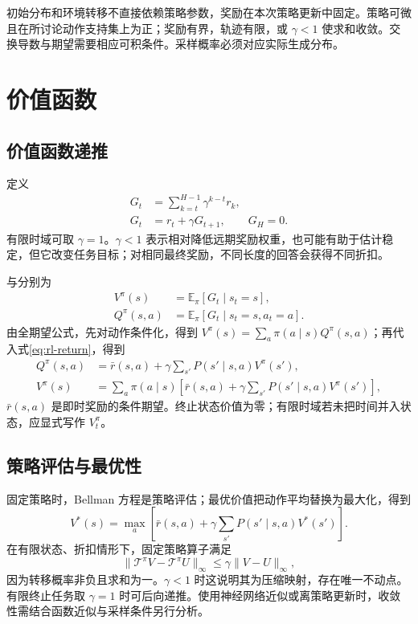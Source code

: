 \documentclass[../textbook.tex]{subfiles}
\begin{document}
\begin{assumption}[策略梯度的前提]
初始分布和环境转移不直接依赖策略参数，奖励在本次策略更新中固定。策略可微且在所讨论动作支持集上为正；奖励有界，轨迹有限，或 $\gamma<1$ 使求和收敛。交换导数与期望需要相应可积条件。采样概率必须对应实际生成分布。
\end{assumption}

\section{价值函数}

\subsection{价值函数递推}
定义
\begin{equation}\label{eq:rl-return}
\begin{aligned}
 G_t &= \sum_{k=t}^{H-1}\gamma^{k-t}r_k, \\
 G_t &= r_t+\gamma G_{t+1}, \qquad G_H=0.
\end{aligned}
\end{equation}
有限时域可取 $\gamma=1$。$\gamma<1$ 表示相对降低远期奖励权重，也可能有助于估计稳定，但它改变任务目标；对相同最终奖励，不同长度的回答会获得不同折扣。

与分别为
\begin{equation}
\begin{aligned}
 V^\pi(s) &= \mathbb E_\pi[G_t\mid s_t=s], \\
 Q^\pi(s,a) &= \mathbb E_\pi[G_t\mid s_t=s,a_t=a].
\end{aligned}
\end{equation}
由全期望公式，先对动作条件化，得到 $V^\pi(s)=\sum_a\pi(a\mid s)Q^\pi(s,a)$；再代入式\eqref{eq:rl-return}，得到
\begin{align}
 Q^\pi(s,a)&=\bar r(s,a)+\gamma\sum_{s'}P(s'\mid s,a)V^\pi(s'),\\
 V^\pi(s)&=\sum_a\pi(a\mid s)\left[\bar r(s,a)+\gamma\sum_{s'}P(s'\mid s,a)V^\pi(s')\right],
 \label{eq:rl-bellman}
\end{align}
$\bar r(s,a)$ 是即时奖励的条件期望。终止状态价值为零；有限时域若未把时间并入状态，应显式写作 $V_t^\pi$。

\subsection{策略评估与最优性}
固定策略时，Bellman 方程是策略评估；最优价值把动作平均替换为最大化，得到
\begin{equation}
 V^*(s)=\max_a\left[\bar r(s,a)+\gamma\sum_{s'}P(s'\mid s,a)V^*(s')\right].
\end{equation}
在有限状态、折扣情形下，固定策略算子满足
\begin{equation}
 \|\mathcal T^\pi V-\mathcal T^\pi U\|_\infty
 \le\gamma\|V-U\|_\infty,
\end{equation}
因为转移概率非负且求和为一。$\gamma<1$ 时这说明其为压缩映射，存在唯一不动点。有限终止任务取 $\gamma=1$ 时可后向递推。使用神经网络近似或离策略更新时，收敛性需结合函数近似与采样条件另行分析。
\end{document}
